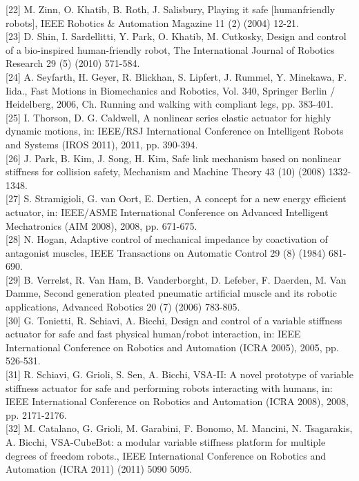 \documentclass[10pt]{article}
\begin{document}
[22] M. Zinn, O. Khatib, B. Roth, J. Salisbury, Playing it safe [humanfriendly robots], IEEE Robotics \& Automation Magazine 11 (2) (2004) 12-21.\\[0pt]
[23] D. Shin, I. Sardellitti, Y. Park, O. Khatib, M. Cutkosky, Design and control of a bio-inspired human-friendly robot, The International Journal of Robotics Research 29 (5) (2010) 571-584.\\[0pt]
[24] A. Seyfarth, H. Geyer, R. Blickhan, S. Lipfert, J. Rummel, Y. Minekawa, F. Iida., Fast Motions in Biomechanics and Robotics, Vol. 340, Springer Berlin / Heidelberg, 2006, Ch. Running and walking with compliant legs, pp. 383-401.\\[0pt]
[25] I. Thorson, D. G. Caldwell, A nonlinear series elastic actuator for highly dynamic motions, in: IEEE/RSJ International Conference on Intelligent Robots and Systems (IROS 2011), 2011, pp. 390-394.\\[0pt]
[26] J. Park, B. Kim, J. Song, H. Kim, Safe link mechanism based on nonlinear stiffness for collision safety, Mechanism and Machine Theory 43 (10) (2008) 1332-1348.\\[0pt]
[27] S. Stramigioli, G. van Oort, E. Dertien, A concept for a new energy efficient actuator, in: IEEE/ASME International Conference on Advanced Intelligent Mechatronics (AIM 2008), 2008, pp. 671-675.\\[0pt]
[28] N. Hogan, Adaptive control of mechanical impedance by coactivation of antagonist muscles, IEEE Transactions on Automatic Control 29 (8) (1984) 681-690.\\[0pt]
[29] B. Verrelst, R. Van Ham, B. Vanderborght, D. Lefeber, F. Daerden, M. Van Damme, Second generation pleated pneumatic artificial muscle and its robotic applications, Advanced Robotics 20 (7) (2006) 783-805.\\[0pt]
[30] G. Tonietti, R. Schiavi, A. Bicchi, Design and control of a variable stiffness actuator for safe and fast physical human/robot interaction, in: IEEE International Conference on Robotics and Automation (ICRA 2005), 2005, pp. 526-531.\\[0pt]
[31] R. Schiavi, G. Grioli, S. Sen, A. Bicchi, VSA-II: A novel prototype of variable stiffness actuator for safe and performing robots interacting with humans, in: IEEE International Conference on Robotics and Automation (ICRA 2008), 2008, pp. 2171-2176.\\[0pt]
[32] M. Catalano, G. Grioli, M. Garabini, F. Bonomo, M. Mancini, N. Tsagarakis, A. Bicchi, VSA-CubeBot: a modular variable stiffness platform for multiple degrees of freedom robots., IEEE International Conference on Robotics and Automation (ICRA 2011) (2011) 5090 5095.\\[0pt]
\end{document}
